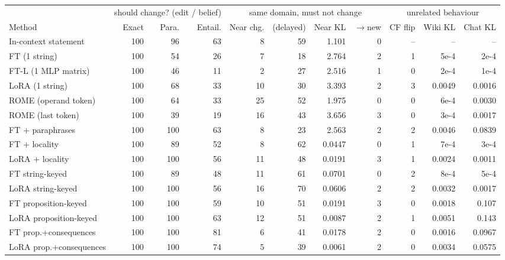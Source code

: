 \begin{tabular}{lrrrrrrrrrr}
\toprule
 & \multicolumn{3}{c}{should change? (edit / belief)} & \multicolumn{4}{c}{same domain, must not change} & \multicolumn{3}{c}{unrelated behaviour} \\
\cmidrule(lr){2-4}\cmidrule(lr){5-8}\cmidrule(lr){9-11}
Method & Exact & Para. & Entail. & Near chg. & (delayed) & Near KL & $\to$new & CF flip & Wiki KL & Chat KL \\
\midrule
In-context statement & 100 & 96 & 63 & 8 & 59 & 1.101 & 0 & -- & -- & -- \\
\addlinespace[2pt]
FT (1 string) & 100 & 54 & 26 & 7 & 18 & 2.764 & 2 & 1 & 5e-4 & 2e-4 \\
FT-L (1 MLP matrix) & 100 & 46 & 11 & 2 & 27 & 2.516 & 1 & 0 & 2e-4 & 1e-4 \\
LoRA (1 string) & 100 & 68 & 33 & 10 & 30 & 3.393 & 2 & 3 & 0.0049 & 0.0016 \\
ROME (operand token) & 100 & 64 & 33 & 25 & 52 & 1.975 & 0 & 0 & 6e-4 & 0.0030 \\
ROME (last token) & 100 & 39 & 19 & 16 & 43 & 3.656 & 3 & 0 & 3e-4 & 0.0017 \\
FT + paraphrases & 100 & 100 & 63 & 8 & 23 & 2.563 & 2 & 2 & 0.0046 & 0.0839 \\
\addlinespace[2pt]
FT + locality & 100 & 89 & 52 & 8 & 62 & 0.0447 & 0 & 1 & 7e-4 & 3e-4 \\
LoRA + locality & 100 & 100 & 56 & 11 & 48 & 0.0191 & 3 & 1 & 0.0024 & 0.0011 \\
\addlinespace[2pt]
FT string-keyed & 100 & 89 & 48 & 11 & 61 & 0.0701 & 0 & 2 & 8e-4 & 5e-4 \\
LoRA string-keyed & 100 & 100 & 56 & 16 & 70 & 0.0606 & 2 & 2 & 0.0032 & 0.0017 \\
\addlinespace[2pt]
FT proposition-keyed & 100 & 100 & 59 & 10 & 51 & 0.0191 & 3 & 0 & 0.0018 & 0.107 \\
LoRA proposition-keyed & 100 & 100 & 63 & 12 & 51 & 0.0087 & 2 & 1 & 0.0051 & 0.143 \\
\addlinespace[2pt]
FT prop.+consequences & 100 & 100 & 81 & 6 & 41 & 0.0178 & 2 & 0 & 0.0016 & 0.0967 \\
LoRA prop.+consequences & 100 & 100 & 74 & 5 & 39 & 0.0061 & 2 & 0 & 0.0034 & 0.0575 \\
\bottomrule
\end{tabular}
